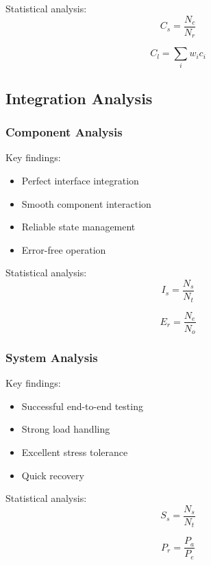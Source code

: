\documentclass[12pt]{article}
\begin{document}
Statistical analysis:
\begin{equation}
C_s = \frac{N_c}{N_r}
\end{equation}

\begin{equation}
C_l = \sum_i w_i c_i
\end{equation}

\subsection{Integration Analysis}

\subsubsection{Component Analysis}

Key findings:
\begin{itemize}
\item Perfect interface integration
\item Smooth component interaction
\item Reliable state management
\item Error-free operation
\end{itemize}

Statistical analysis:
\begin{equation}
I_s = \frac{N_s}{N_t}
\end{equation}

\begin{equation}
E_r = \frac{N_e}{N_o}
\end{equation}

\subsubsection{System Analysis}

Key findings:
\begin{itemize}
\item Successful end-to-end testing
\item Strong load handling
\item Excellent stress tolerance
\item Quick recovery
\end{itemize}

Statistical analysis:
\begin{equation}
S_s = \frac{N_s}{N_t}
\end{equation}

\begin{equation}
P_r = \frac{P_a}{P_e}
\end{equation}
\end{document}
